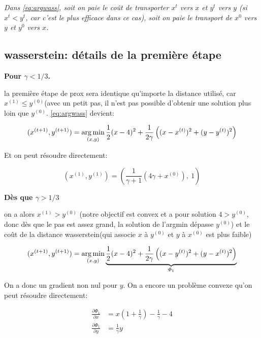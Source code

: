\emph{Dans \cref{eq:argwass}, soit on paie le coût de transporter $x^t$ vers $x$ et $y^t$ vers $y$ (si $x^t < y^t$, car c'est le plus efficace dans ce cas), soit on paie le transport de $x^0$ vers $y$ et $y^0$ vers $x$.}

\subsection{wasserstein: détails de la première étape}

\textbf{Pour $\gamma < 1/3$.}

la première étape de prox sera identique qu'importe la distance utilisé, car $x^{(1)} \leq y^{(0)}$(avec un petit pas, il n'est pas possible d'obtenir une solution plus loin que $y^{(0)}$. \cref{eq:argwass} devient:

\begin{equation}
	(x^{(t+1)}, y^{(t+1)}) = \operatorname*{arg\,min}_{(x, y)} \frac{1}{2}(x-4)^2 + \frac{1}{2 \gamma} \left((x-x^{(t)})^2 + (y - y^{(t)})^2\right)
\end{equation}

Et on peut résoudre directement:

\begin{equation}
	(x^{(1)}, y^{(1)}) = (\frac{1}{\gamma + 1} \left( 4 \gamma + x^{(0)} \right), \ 1)
\end{equation}

\textbf{Dès que $\gamma > 1/3$}

on a alors $x^{(1)} > y^{(0)}$ (notre objectif est convex et a pour solution $4 > y^{(0)}$, donc dès que le pas est assez grand, la solution de l'argmin dépasse $y^{(0)}$) et le coût de la distance wasserstein(qui associe $x$ à $y^{(0)}$ et $y$ à $x^{(0)}$ est plus faible)

\begin{equation}
	(x^{(t+1)}, y^{(t+1)}) = \operatorname*{arg\,min}_{(x, y)} \underbrace{\frac{1}{2}(x-4)^2 + \frac{1}{2 \gamma} \left((x-y^{(t)})^2 + (y - x^{(t)})^2\right)}_{\varPhi_1}
\end{equation}

On a donc un gradient non nul pour $y$. On a encore un problème convexe qu'on peut résoudre directement:

\begin{align}
	\frac{\partial \varPhi_1}{\partial x} &= x \left( 1 + \frac{1}{\gamma} \right) - \frac{1}{\gamma} - 4 \\
	\frac{\partial \varPhi_1}{\partial y} &= \frac{1}{\gamma} y
\end{align}

